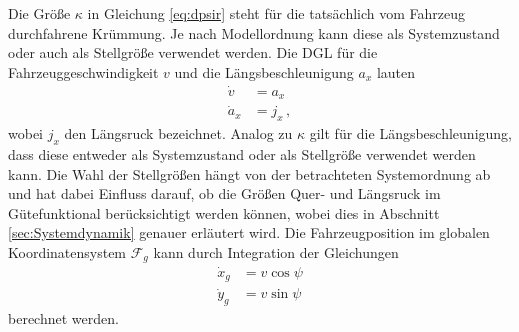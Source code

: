 Die Größe $\kappa$ in Gleichung \eqref{eq:dpsir} steht für die tatsächlich vom Fahrzeug durchfahrene Krümmung. Je nach Modellordnung kann diese als Systemzustand oder auch als Stellgröße verwendet werden. Die \gls{DGL} für die Fahrzeuggeschwindigkeit $v$ und die Längsbeschleunigung $a_x$ lauten
\begin{align}
\dot{v} &= a_x \label{eq:dv} \\
\dot{a}_x &= j_x \label{eq:dax}\,,
\end{align}
wobei $j_x$ den Längsruck bezeichnet. Analog zu $\kappa$ gilt für die Längsbeschleunigung, dass diese entweder als Systemzustand oder als Stellgröße verwendet werden kann. Die Wahl der Stellgrößen hängt von der betrachteten Systemordnung ab und hat dabei Einfluss darauf, ob die Größen Quer- und Längsruck im Gütefunktional berücksichtigt werden können, wobei dies in Abschnitt \ref{sec:Systemdynamik} genauer erläutert wird. Die Fahrzeugposition im globalen Koordinatensystem $\mathcal{F}_g$ kann durch Integration der Gleichungen
\begin{align}
\dot{x}_g &= v\cos{\psi} \\
\dot{y}_g &= v\sin{\psi}
\end{align}
berechnet werden.

